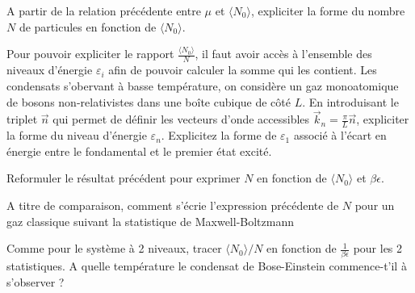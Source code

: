 \question
A partir de la relation précédente entre $\mu$ et $\langle N_0 \rangle$, expliciter la forme du nombre $N$ de particules en fonction de $\langle N_0 \rangle$.

\question
Pour pouvoir expliciter le rapport $\frac{\langle N_0 \rangle}{N}$, il faut avoir accès à l'ensemble des niveaux d'énergie $\varepsilon_i$ afin de pouvoir calculer la somme qui les contient. Les condensats s'obervant à basse température, on considère un gaz monoatomique de bosons non-relativistes dans une boîte cubique de côté $L$. En introduisant le triplet $\vec{n}$ qui permet de définir les vecteurs d'onde accessibles $\vec{k}_n = \frac{\pi}{L} \vec{n}$, expliciter la forme du niveau d'énergie $\varepsilon_n$. Explicitez la forme de $\varepsilon_1$ associé à l'écart en énergie entre le fondamental et le premier état excité.

\question
Reformuler le résultat précédent pour exprimer $N$ en fonction de $\langle N_0 \rangle$ et $\beta \epsilon$.

\question
A titre de comparaison, comment s'écrie l'expression précédente de $N$ pour un gaz classique suivant la statistique de Maxwell-Boltzmann


\bigskip
{}

\question
Comme pour le système à 2 niveaux, tracer $\langle N_0 \rangle/N$ en fonction de $\frac{1}{\beta \epsilon}$ pour les 2 statistiques. A quelle température le condensat de Bose-Einstein commence-t'il à s'observer ?


